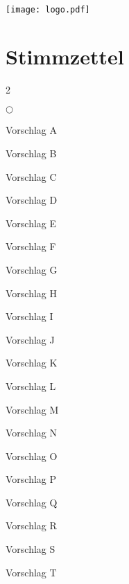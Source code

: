 \huge
\hfill
\texttt{[image: logo.pdf]}
\vspace{-1em}
\section*{Stimmzettel}

\begin{multicols}{2}
    \begin{list}{$\bigcirc$}{}
        \setlength\itemsep{1em}
        \item Vorschlag A
        \item Vorschlag B
        \item Vorschlag C
        \item Vorschlag D
        \item Vorschlag E
        \item Vorschlag F
        \item Vorschlag G
        \item Vorschlag H
        \item Vorschlag I
        \item Vorschlag J
        \item Vorschlag K
        \item Vorschlag L
        \item Vorschlag M
        \item Vorschlag N
        \item Vorschlag O
        \item Vorschlag P
        \item Vorschlag Q
        \item Vorschlag R
        \item Vorschlag S
        \item Vorschlag T
    \end{list}
\end{multicols}